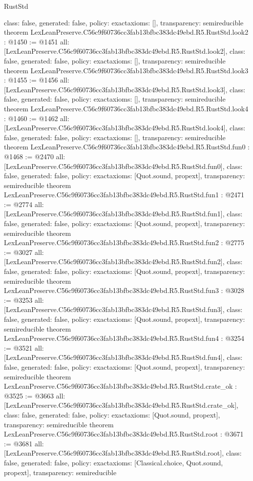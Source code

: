 \begin{lexlean}{RustStd}
\begin{coremodule}
{  class: false,
  generated: false,
  policy: exact{axioms: []},
  transparency: semireducible
}
theorem LexLeanPreserve.C56c9f60736cc3fab13bfbc383dc49ebd.R5.RustStd.look2 : @1450 := @1451 {
  all: [LexLeanPreserve.C56c9f60736cc3fab13bfbc383dc49ebd.R5.RustStd.look2],
  class: false,
  generated: false,
  policy: exact{axioms: []},
  transparency: semireducible
}
theorem LexLeanPreserve.C56c9f60736cc3fab13bfbc383dc49ebd.R5.RustStd.look3 : @1455 := @1456 {
  all: [LexLeanPreserve.C56c9f60736cc3fab13bfbc383dc49ebd.R5.RustStd.look3],
  class: false,
  generated: false,
  policy: exact{axioms: []},
  transparency: semireducible
}
theorem LexLeanPreserve.C56c9f60736cc3fab13bfbc383dc49ebd.R5.RustStd.look4 : @1460 := @1462 {
  all: [LexLeanPreserve.C56c9f60736cc3fab13bfbc383dc49ebd.R5.RustStd.look4],
  class: false,
  generated: false,
  policy: exact{axioms: []},
  transparency: semireducible
}
theorem LexLeanPreserve.C56c9f60736cc3fab13bfbc383dc49ebd.R5.RustStd.fun0 : @1468 := @2470 {
  all: [LexLeanPreserve.C56c9f60736cc3fab13bfbc383dc49ebd.R5.RustStd.fun0],
  class: false,
  generated: false,
  policy: exact{axioms: [Quot.sound, propext]},
  transparency: semireducible
}
theorem LexLeanPreserve.C56c9f60736cc3fab13bfbc383dc49ebd.R5.RustStd.fun1 : @2471 := @2774 {
  all: [LexLeanPreserve.C56c9f60736cc3fab13bfbc383dc49ebd.R5.RustStd.fun1],
  class: false,
  generated: false,
  policy: exact{axioms: [Quot.sound, propext]},
  transparency: semireducible
}
theorem LexLeanPreserve.C56c9f60736cc3fab13bfbc383dc49ebd.R5.RustStd.fun2 : @2775 := @3027 {
  all: [LexLeanPreserve.C56c9f60736cc3fab13bfbc383dc49ebd.R5.RustStd.fun2],
  class: false,
  generated: false,
  policy: exact{axioms: [Quot.sound, propext]},
  transparency: semireducible
}
theorem LexLeanPreserve.C56c9f60736cc3fab13bfbc383dc49ebd.R5.RustStd.fun3 : @3028 := @3253 {
  all: [LexLeanPreserve.C56c9f60736cc3fab13bfbc383dc49ebd.R5.RustStd.fun3],
  class: false,
  generated: false,
  policy: exact{axioms: [Quot.sound, propext]},
  transparency: semireducible
}
theorem LexLeanPreserve.C56c9f60736cc3fab13bfbc383dc49ebd.R5.RustStd.fun4 : @3254 := @3521 {
  all: [LexLeanPreserve.C56c9f60736cc3fab13bfbc383dc49ebd.R5.RustStd.fun4],
  class: false,
  generated: false,
  policy: exact{axioms: [Quot.sound, propext]},
  transparency: semireducible
}
theorem LexLeanPreserve.C56c9f60736cc3fab13bfbc383dc49ebd.R5.RustStd.crate_ok : @3525 := @3663 {
  all: [LexLeanPreserve.C56c9f60736cc3fab13bfbc383dc49ebd.R5.RustStd.crate_ok],
  class: false,
  generated: false,
  policy: exact{axioms: [Quot.sound, propext]},
  transparency: semireducible
}
theorem LexLeanPreserve.C56c9f60736cc3fab13bfbc383dc49ebd.R5.RustStd.root : @3671 := @3681 {
  all: [LexLeanPreserve.C56c9f60736cc3fab13bfbc383dc49ebd.R5.RustStd.root],
  class: false,
  generated: false,
  policy: exact{axioms: [Classical.choice, Quot.sound, propext]},
  transparency: semireducible
}


\end{coremodule}
\end{lexlean}

